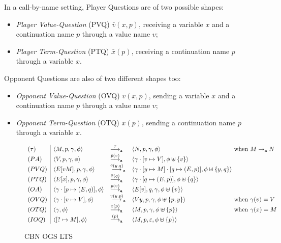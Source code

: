 \documentclass[11pt,a4paper]{amsart}
\theoremstyle{plain}
\theoremstyle{definition}
\theoremstyle{defC}
\theoremstyle{thmC}
\theoremstyle{plain}
\numberwithin{equation}{section}
\newcommand{\rmm}[1]{{\tt{\lowercase{#1}}}}
\newcommand{\genarr}[2]{\mathrel{\stackrel{{#1}}{\longrightarrow}_{\rmm{\lowercase{#2}}}}}
\newcommand{\arrA}[1]{\genarr{#1}{A}}  %
\newcommand{\ired}[1]{\xrightarrow{#1}_i}
\newcommand{\initName}{}
\newcommand{\dsOLD}[1]{} %
\newcommand{\dsOLD}[1]{}
\newcommand{\emptymap}{\varepsilon}
\newcommand{\pmap}[2]{[#1 \mapsto #2]}
\newcommand{\FV}{{\tt fv}}
\newcommand{\redn}{\rightarrow_{\tt{n}}}
\newcommand{\ansP}[2]{\bar{#1}(#2)}
\newcommand{\questPV}[3]{\bar{#1}(#2,#3)}
\newcommand{\questPT}[2]{\bar{#1}(#2)}
\newcommand{\ansO}[2]{#1(#2)}
\newcommand{\questOV}[3]{#1(#2,#3)}
\newcommand{\questOT}[2]{#1(#2)}
\newcommand{\questOinit}[1]{(#1)}
\newcommand{\conf}[1]{\langle #1\rangle}
\newcommand{\initconf}[2]{\langle[? \mapsto #2], #1\rangle}
\theoremstyle{plain}
\theoremstyle{definition}
\begin{document}
\dsOLD{revise Figure~\ref{f:cbnG}}

\noindent
In a call-by-name setting, Player Questions are of two possible shapes:
 \begin{itemize}
  \item \emph{Player Value-Question} (PVQ) $\questPV{v}{x}{p}$,
  receiving a variable $x$ and a continuation name $p$ through a value name $v$;
  \item \emph{Player Term-Question} (PTQ) $\questPT{x}{p}$,
  receiving a continuation name $p$ through a variable $x$.
 \end{itemize}
\noindent
 Opponent Questions are also of two different shapes too:
  \begin{itemize}
   \item \emph{Opponent Value-Question} (OVQ) $\questOV{v}{x}{p}$,
  sending a variable $x$ and a continuation name $p$ through a value name $v$;
  \item \emph{Opponent Term-Question} (OTQ) $\questOT{x}{p}$,
  sending a continuation name $p$ through a variable $x$.
 \end{itemize}
  

 
 
 \begin{figure}
 \setlength{\arraycolsep}{3pt}%
 \[
  \begin{array}{l|lll@{}l}
   (\tau) & \conf{M,p,\gamma,\phi} & \arrA{\ \tau \ } & 
     \conf{N,p,\gamma,\phi} & \text{ when } M \redn N\\
%
   (PA) & \conf{V,p,\gamma,\phi} & \arrA{\ansP{p}{v}} & 
     \conf{\gamma \cdot \pmap{v}{V},\phi \uplus \{v\}} \\
%
   (PVQ) & \conf{E[vM],p,\gamma,\phi} & \arrA{\questPV{v}{y}{q}} & 
     \conf{\gamma \cdot \pmap{y}{M}\cdot \pmap{q}{(E,p)},\phi \uplus \{y,q\}} \\
%
   (PTQ) & \conf{E[x],p,\gamma,\phi} & \arrA{\questPT{x}{q}} & 
     \conf{\gamma \cdot \pmap{q}{(E,p)},\phi \uplus \{q\}} \\
%
   (OA) & \conf{\gamma\cdot \pmap{p}{(E,q)},\phi} & \arrA{\ansO{p}{v}} & 
     \conf{E[v],q,\gamma,\phi \uplus \{v\}} \\ %
%
   (OVQ) & \conf{\gamma \cdot [v \mapsto V],\phi} & \arrA{\questOV{v}{y}{p}} & 
     \conf{V y,p,\gamma,\phi \uplus \{p,y\}} & \text{ when } \gamma(v) = V\\
%
   (OTQ) & \conf{\gamma,\phi} & \arrA{\questOT{x}{p}} & 
     \conf{M,p,\gamma,\phi \uplus \{p\}} & \text{ when } \gamma(x) = M\\
%
   (IOQ) & \initconf{\phi}{M} & \arrA{\questOinit{p}} &
     \conf{M,p,\emptymap,\phi \uplus \{p\}}
%
  \end{array}
 \]
 \caption{CBN OGS LTS}
\label{fig:scbn-lts}
\end{figure}
\end{document}
